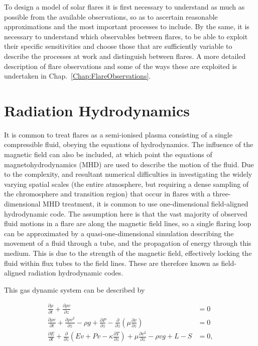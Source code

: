 To design a model of solar flares it is first necessary to understand as much as possible from the available observations, so as to ascertain reasonable approximations and the most important processes to include.
By the same, it is necessary to understand which observables between flares, to be able to exploit their specific sensitivities and choose those that are sufficiently variable to describe the processes at work and distinguish between flares.
A more detailed description of flare observations and some of the ways these are exploited is undertaken in Chap.~\ref{Chap:FlareObservations}.

\section{Radiation Hydrodynamics}


It is common to treat flares as a semi-ionised plasma consisting of a single compressible fluid, obeying the equations of hydrodynamics. The influence of the magnetic field can also be included, at which point the equations of magnetohydrodynamics (MHD) are used to describe the motion of the fluid.
Due to the complexity, and resultant numerical difficulties in investigating the widely varying spatial scales (the entire atmosphere, but requiring a dense sampling of the chromosphere and transition region) that occur in flares with a three-dimensional MHD treatment, it is common to use one-dimensional field-aligned hydrodynamic code.
The assumption here is that the vast majority of observed fluid motions in a flare are along the magnetic field lines, so a single flaring loop can be approximated by a quasi-one-dimensional simulation describing the movement of a fluid through a tube, and the propagation of energy through this medium.
This is due to the strength of the magnetic field, effectively locking the fluid within flux tubes to the field lines.
These are therefore known as field-aligned radiation hydrodynamic codes.

This gas dynamic system can be described by

\begin{equation}
    \begin{aligned}
    \frac{\partial \rho}{\partial t} + \frac{\partial \rho v}{\partial z} &= 0\\
    \frac{\partial \rho v}{\partial t} + \frac{\partial \rho v^2}{\partial z} - \rho g + \frac{\partial P}{\partial z} - \frac{\partial}{\partial z}\left(\mu \frac{\partial v}{\partial z}\right) &= 0\\
    \frac{\partial E}{\partial t} + \frac{\partial}{\partial z}\left( Ev + Pv - \kappa\frac{\partial T}{\partial z} \right)+ \mu\frac{\partial v^2}{\partial z} -\rho v g + L - S &= 0,
    \end{aligned}\label{Eq:RhdEquations}
\end{equation}

